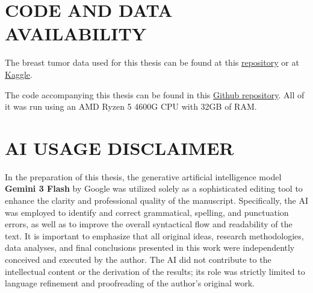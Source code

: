 \documentclass[en]{dimscthesis}
\begin{document}
\begin{appendix}
    \appendixstartedtrue

    \chapter{CODE AND DATA AVAILABILITY}
	The breast tumor data used for this thesis can be found at this \href{https://archive.ics.uci.edu/dataset/17/breast+cancer+wisconsin+diagnostic}{repository}  \cite{bib:breast_cancer_wisconsin_(diagnostic)_17} or at \href{https://www.kaggle.com/datasets/uciml/breast-cancer-wisconsin-data}{Kaggle}.
	
	The code accompanying this thesis can be found in this \href{https://github.com/vex-me-not/Master_Thesis}{Github repository}.
	All of it was run using an AMD Ryzen 5 4600G CPU with 32GB of RAM.
	

    \chapter{AI USAGE DISCLAIMER}
  
	In the preparation of this thesis, the generative artificial intelligence model \textbf{Gemini 3 Flash} by Google was utilized solely as a sophisticated editing tool to enhance the clarity and professional quality of the manuscript. Specifically, the AI was employed to identify and correct grammatical, spelling, and punctuation errors, as well as to improve the overall syntactical flow and readability of the text. It is important to emphasize that all original ideas, research methodologies, data analyses, and final conclusions presented in this work were independently conceived and executed by the author. The AI did not contribute to the intellectual content or the derivation of the results; its role was strictly limited to language refinement and proofreading of the author's original work.


\end{appendix}


\nocite{*}
{\footnotesize }
\end{document}
